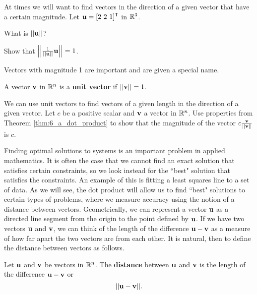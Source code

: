 \begin{pa}
	\ea
	
\item At times we will want to find vectors in the direction of a given vector that have a certain magnitude. Let $\mathbf{u} = [2 \ 2 \ 1]^{\mathsf{T}}$ in $\mathbb{R}^3$.
	\ba
	\item What is $|| \mathbf{u} ||$? 

	\item Show that $\left| \left| \frac{1}{||\mathbf{u}||} \mathbf{u} \right| \right| = 1$. 

	
	\item Vectors with magnitude 1 are important and are given a special name.

\begin{definition} \label{def:6_a_unit_vector} A vector $\mathbf{v}$ in $\mathbb{R}^n$ is a \textbf{unit vector} if $|| \mathbf{v} || = 1$.
\end{definition}

We can use unit vectors to find vectors of a given length in the direction of a given vector. Let $c$ be a positive scalar and $\mathbf{v}$ a vector in $\mathbb{R}^n$. Use properties from Theorem \ref{thm:6_a_dot_product} to show that the magnitude of the vector $c \frac{\mathbf{v}}{||\mathbf{v}||}$ is $c$. 

	\ea
		

\ee

\end{pa}


\label{sec:dist_vec}

Finding optimal solutions to systems is an important problem in applied mathematics. It is often the case that we cannot find an exact solution that satisfies certain constraints, so we look instead for the ``best" solution that satisfies the constraints. An example of this is fitting a least squares line to a set of data. As we will see, the dot product will allow us to find ``best" solutions to certain types of problems, where we measure accuracy using the notion of a distance between vectors. Geometrically, we can represent a vector $\mathbf{u}$ as a directed line segment from the origin to the point defined by $\mathbf{u}$. If we have two vectors $\mathbf{u}$ and $\mathbf{v}$, we can think of the length of the difference $\mathbf{u} - \mathbf{v}$ as a measure of how far apart the two vectors are from each other. It is natural, then to define the distance between vectors as follows.

\begin{definition} \label{def:6_a_distance} Let $\mathbf{u}$ and $\mathbf{v}$ be vectors in $\mathbb{R}^n$. The \textbf{distance} between $\mathbf{u}$ and $\mathbf{v}$ is the length of the difference $\mathbf{u} - \mathbf{v}$ or
\[|| \mathbf{u} - \mathbf{v} ||.\]
\end{definition}


